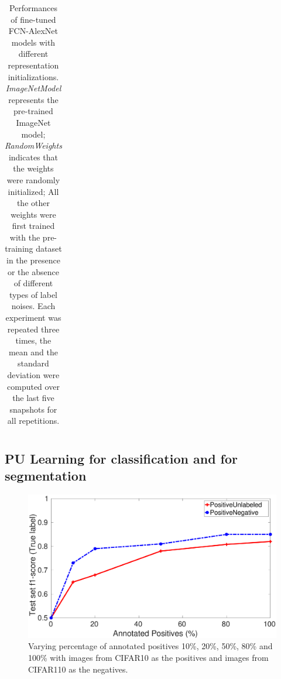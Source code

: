 \begin{table}[t]
{\begin{tabular}{l|llll}
\end{tabular}
}
\caption{Performances of fine-tuned FCN-AlexNet models with different representation initializations.
\textit{ImageNetModel} represents the pre-trained ImageNet model;
\textit{RandomWeights} indicates that the weights were randomly initialized;
All the other weights were first trained with the pre-training dataset in the presence or the absence of different types of label noises.
Each experiment was repeated three times, the mean and the standard deviation were computed over the last five snapshots for all repetitions.
}
\label{tab:robustness}
\end{table}



\subsection{PU Learning for classification and for segmentation}
\label{subsec:pulearning}

\begin{figure}[t]
\centering
   \includegraphics[width=\linewidth]{img/pu_vs_pn}
\caption{Varying percentage of annotated positives 10\%, 20\%, 50\%, 80\% and 100\% with images from CIFAR10 as the positives and images from CIFAR110 as the negatives.}
\label{fig:pct_annotating}
\end{figure}

